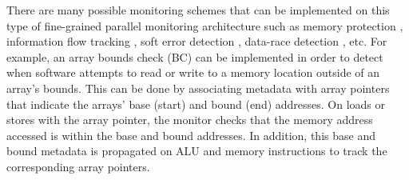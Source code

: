 There are many possible monitoring schemes that can be implemented on this type
of fine-grained parallel monitoring architecture such as memory protection
\cite{mondrian-asplos02}, information flow tracking \cite{dift-asplos04,
testudo-micro08}, soft error detection \cite{argus-micro07}, data-race
detection \cite{cord-hpca06, eraser-tocs97, literace-pldi09, pacer-pldi10},
etc.  For example, an array bounds check (BC) \cite{hardbound-asplos08} can be
implemented in order to detect when software attempts to read or write to a
memory location outside of an array's bounds. This can be done by associating
metadata with array pointers that indicate the arrays' base (start) and bound
(end) addresses. On loads or stores with the array pointer, the monitor checks
that the memory address accessed is within the base and bound addresses. In
addition, this base and bound metadata is propagated on ALU and memory
instructions to track the corresponding array pointers.


